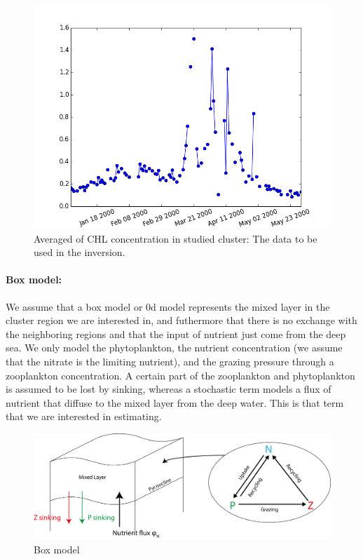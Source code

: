 \documentclass{article}
\begin{document}
  \begin{figure}[ht]
  \centering
    \includegraphics[scale=.3]{./chl_ts.png}
  \caption{Averaged of CHL concentration in studied cluster: The data to be used in the inversion.}
  \end{figure}


  \paragraph{Box model:}

  We assume that a box model or 0d model represents the mixed layer in the cluster region we are interested in, and futhermore that there is no exchange with the neighboring regions and that the input of nutrient just come from the deep sea. We only model the phytoplankton, the nutrient concentration (we assume that the nitrate is the limiting nutrient), and the grazing pressure through a zooplankton concentration. A certain part of the zooplankton and phytoplankton is assumed to be lost by sinking, whereas a stochastic term models a flux of nutrient that diffuse to the mixed layer from the deep water. This is that term that we are interested in estimating.

  \begin{figure}[ht]
  \centering
    \includegraphics[scale=.3]{./model.png}
  \caption{Box model}
  \end{figure}
\end{document}
